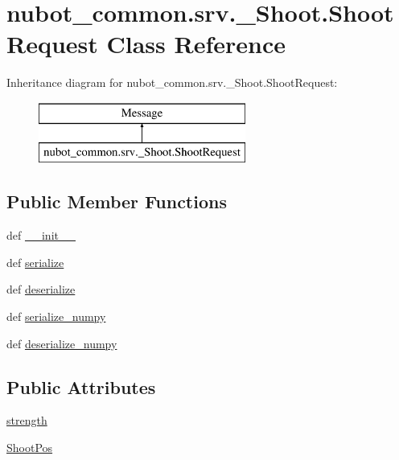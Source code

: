 \hypertarget{classnubot__common_1_1srv_1_1__Shoot_1_1ShootRequest}{\section{nubot\-\_\-common.\-srv.\-\_\-\-Shoot.\-Shoot\-Request Class Reference}
\label{classnubot__common_1_1srv_1_1__Shoot_1_1ShootRequest}
}
Inheritance diagram for nubot\-\_\-common.\-srv.\-\_\-\-Shoot.\-Shoot\-Request\-:\begin{figure}[H]
\begin{center}
\leavevmode
\includegraphics[height=2.000000cm]{classnubot__common_1_1srv_1_1__Shoot_1_1ShootRequest}
\end{center}
\end{figure}
\subsection*{Public Member Functions}
\begin{DoxyCompactItemize}
\item 
def \hyperlink{classnubot__common_1_1srv_1_1__Shoot_1_1ShootRequest_a0cc9324c559f125bdbd1f3df0bfa710a}{\-\_\-\-\_\-init\-\_\-\-\_\-}
\item 
def \hyperlink{classnubot__common_1_1srv_1_1__Shoot_1_1ShootRequest_ae45ee357b2c7f05719083ff6d36e0355}{serialize}
\item 
def \hyperlink{classnubot__common_1_1srv_1_1__Shoot_1_1ShootRequest_af0e6062425d6294c402eb1135715052d}{deserialize}
\item 
def \hyperlink{classnubot__common_1_1srv_1_1__Shoot_1_1ShootRequest_af34cf07da7a68198cdb5ebff24324cbb}{serialize\-\_\-numpy}
\item 
def \hyperlink{classnubot__common_1_1srv_1_1__Shoot_1_1ShootRequest_a2211ea3784a552bd5aba1f3f08477719}{deserialize\-\_\-numpy}
\end{DoxyCompactItemize}
\subsection*{Public Attributes}
\begin{DoxyCompactItemize}
\item 
\hyperlink{classnubot__common_1_1srv_1_1__Shoot_1_1ShootRequest_add5086aea801a8fe77b99815e1d66440}{strength}
\item 
\hyperlink{classnubot__common_1_1srv_1_1__Shoot_1_1ShootRequest_a2faff239a641d95970ca1ed02a60d935}{Shoot\-Pos}
\end{DoxyCompactItemize}
